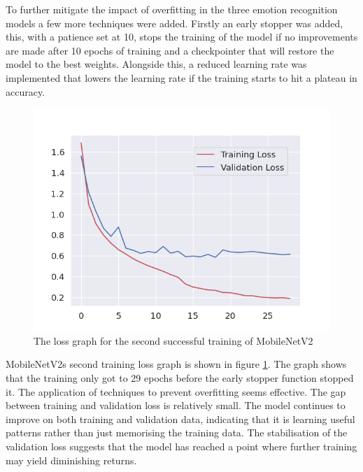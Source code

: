 To further mitigate the impact of overfitting in the three emotion recognition models a few more techniques were added. Firstly an early stopper was added, this, with a patience set at 10, stops the training of the model if no improvements are made after 10 epochs of training and a checkpointer that will restore the model to the best weights. Alongside this, a reduced learning rate was implemented that lowers the learning rate if the training starts to hit a plateau in accuracy. 

\begin{figure}[H]
    \centering 
    \includegraphics[scale=0.5]{fed_images/train_loss_MobileNetv2_ofp.png}
    \caption{The loss graph for the second successful training of MobileNetV2}
    \label{figure:loss_mnv2_ofp}
\end{figure}

MobileNetV2s second training loss graph is shown in figure \ref{figure:loss_mnv2_ofp}. The graph shows that the training only got to 29 epochs before the early stopper function stopped it. The application of techniques to prevent overfitting seems effective. The gap between training and validation loss is relatively small. The model continues to improve on both training and validation data, indicating that it is learning useful patterns rather than just memorising the training data. The stabilisation of the validation loss suggests that the model has reached a point where further training may yield diminishing returns.

